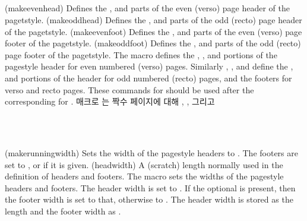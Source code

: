 \begin{plainlist}
\begin{syntax}
\cmd{\makeevenhead} \\
\cmd{\makeoddhead} \\
\cmd{\makeevenfoot} \\
\cmd{\makeoddfoot} \\
\end{syntax}
\glossary(makeevenhead)%
  {}%
  {Defines the ,  and  parts of the
   even (verso) page header of the  pagetstyle.}
\glossary(makeoddhead)%
  {}%
  {Defines the ,  and  parts of the
   odd (recto) page header of the  pagetstyle.}
\glossary(makeevenfoot)%
  {}%
  {Defines the ,  and  parts of the
   even (verso) page footer of the  pagetstyle.}
\glossary(makeoddfoot)%
  {}%
  {Defines the ,  and  parts of the
   odd (recto) page footer of the  pagetstyle.}
The macro \cmd{\makeevenhead} defines the , , and
 portions of the  pagestyle header 
for even numbered (verso) pages. 
Similarly \cmd{\makeoddhead}, \cmd{\makeevenfoot}, and
\cmd{\makeoddfoot} define the ,  and 
portions of the  header for odd numbered 
(recto) pages, and the footers for verso and recto pages. 
These commands for 
should be used after the corresponding \cmd{\makepagestyle} for .
매크로 \cmd{\makeevenhead}는 짝수 페이지에 대해 , ,
그리고 

\begin{syntax}
\cmd{\makerunningwidth} \\
\lnc{\headwidth} \\
\end{syntax}
\glossary(makerunningwidth)%
  {}%
  {Sets the width of the  pagestyle headers to .
   The footers are set to , or  if it
   is given.}
\glossary(headwidth)%
  {}%
  {A (scratch) length normally used in the definition of headers and footers.}
The macro \cmd{\makerunningwidth} sets the widths of the 
pagestyle headers and footers. The header
width is set to . If the optional  is
present, then the footer width is set to that, otherwise to .
The header width is stored as the length 
and the footer width as .


\end{plainlist}
